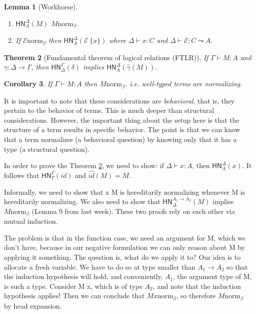 \documentclass{article}
\newtheorem{thm}{Theorem}
\newtheorem{cor}[thm]{Corollary}
\newtheorem{lem}[thm]{Lemma}
\newcommand{\hasEF}[3]{\ensuremath{#1 \vdash #2 : #3}}
\newcommand{\bnorm}[1]{\ensuremath{#1 \mathrel{\text{norm}_\beta}}}
\newcommand{\hnorm}[3]{\ensuremath{\mathsf{HN}^{#1}_{#2}(#3)}}
\newcommand{\fn}[2]{\ensuremath{#1 \to #2}}
\newcommand{\ap}[2]{\ensuremath{#1\ #2}}
\newcommand{\E}{\mathcal{E}}
\begin{document}
\begin{lem}[Workhorse]\label{lem:workhorse}
\leavevmode %
\begin{enumerate}
\item {} \hnorm{\Delta}{A}{M}  \bnorm{M}.
\item If \bnorm{\E} then \hnorm{\Delta}{A}{\ap{\E}{\{x\}}} where \hasEF{\Delta}{x}{C} and \hasEF{\Delta}{\E}{C \leadsto A}.
\end{enumerate}
\end{lem}


\begin{thm}[Fundamental theorem of logical relations (FTLR)]
\label{FTLR}
 If \hasEF{\Gamma}{M}{A} and $\gamma: \Delta \to \Gamma$, then $\hnorm{\Gamma}{\Delta}{\delta}$ implies $\hnorm{\Delta}{A}{\hat{\gamma}(M)}$.
 \end{thm}
 
 \begin{cor}
  If \hasEF{\Gamma}{M}{A} then \bnorm{M}. i.e. well-typed terms are normalizing.
 \end{cor}

It is important to note that these considerations are \textit{behavioral}, that is, they pertain to the behavior of terms. This is much deeper than structural considerations. However, the important thing about the setup here is that the structure of a term results in specific behavior. The point is that we can know that a term normalizes (a behavioral question) by knowing only that it has a type (a structural question).

In order to prove the Theorem \ref{FTLR}, we need to show: if \hasEF{\Delta}{x}{A}, then \hnorm{\Delta}{A}{x}. It follows that \hnorm{\Gamma}{\Gamma}{id} and $\hat{id}(M) = M$.

Informally, we need to show that x M is hereditarily normalizing whenever M is hereditarily normalizing. We also need to show that \hnorm{\fn{A_1}{A_2}}{\Delta}{M} implies \bnorm{M} (Lemma 9 from last week). These two proofs rely on each other via mutual induction.

The problem is that in the function case, we need an argument for M, which we don't have, because in our negative formulation we can only reason about M by applying it something. The question is, what do we apply it to? Our idea is to allocate a fresh variable. We have to do so at type smaller than \fn{A_1}{A_2} so that the induction hypothesis will hold, and conveniently, $A_1$, the argument type of M, is such a type. Consider M x, which is of type $A_2$, and note that the induction hypothesis applies! Then we can conclude that \bnorm{M x}, so therefore \bnorm{M} by head expansion.
\end{document}
